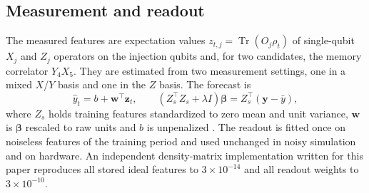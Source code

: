 \documentclass[journal]{IEEEtran}
\newcommand{\Tr}{\operatorname{Tr}}
\begin{document}
\subsection{Measurement and readout}
The measured features are expectation values $z_{t,j}=\Tr(O_j\rho_t)$ of single-qubit $X_j$ and $Z_j$ operators on the injection qubits and, for two candidates, the memory correlator $Y_4X_5$. They are estimated from two measurement settings, one in a mixed $X$/$Y$ basis and one in the $Z$ basis. The forecast is
\begin{equation}
\hat y_t=b+\mathbf w^\top\mathbf z_t,\qquad (Z_s^\top Z_s+\lambda I)\bm\beta=Z_s^\top(\mathbf y-\bar y),
\label{eq:readout}
\end{equation}
where $Z_s$ holds training features standardized to zero mean and unit variance, $\mathbf w$ is $\bm\beta$ rescaled to raw units and $b$ is unpenalized \cite{Hoerl1970Ridge}. The readout is fitted once on noiseless features of the training period and used unchanged in noisy simulation and on hardware. An independent density-matrix implementation written for this paper reproduces all stored ideal features to $3\times10^{-14}$ and all readout weights to $3\times10^{-10}$.
\end{document}
